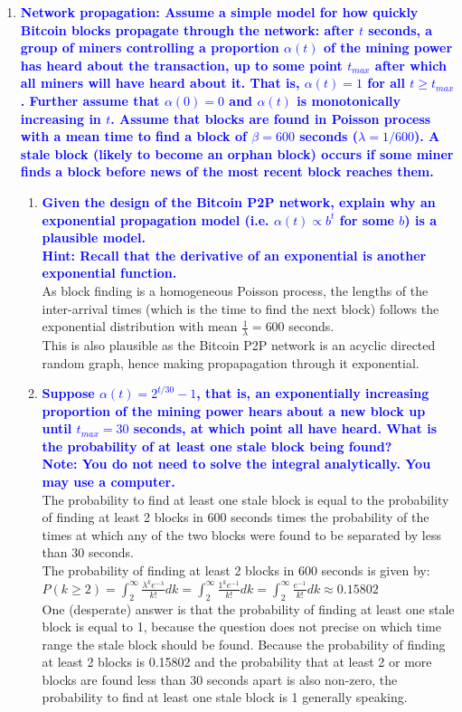 \documentclass[11pt]{article}
\begin{document}
\begin{enumerate}
\item \textbf{\textcolor{blue}{Network propagation: Assume a simple model for how quickly Bitcoin blocks propagate through the network: after $t$ seconds, a group of miners controlling a proportion $\alpha(t)$ of the mining power has heard about the transaction, up to some point $t_{max}$ after which all miners will have heard about it. That is, $\alpha(t) = 1$ for all $t \geq t_{max}$. Further assume that $\alpha(0) = 0$ and $\alpha(t)$ is monotonically increasing in $t$. Assume that blocks are found in Poisson process with a mean time to find a block of $\beta = 600$ seconds ($\lambda = 1/600$). A stale block (likely to become an orphan block) occurs if some miner finds a block before news of the most recent block reaches them.}}
    \begin{enumerate}
    \item \textbf{\textcolor{blue}{Given the design of the Bitcoin P2P network, explain why an exponential propagation model (i.e. $\alpha(t) \propto b^t$ for some $b$) is a plausible model.
    \\ Hint: Recall that the derivative of an exponential is another exponential function.}}
        \\ As block finding is a homogeneous Poisson process, the lengths of the inter-arrival times (which is the time to find the next block) follows the exponential distribution with mean $\frac{1}{\lambda} = 600$ seconds.
        \\ This is also plausible as the Bitcoin P2P network is an acyclic directed random graph, hence making propapagation through it exponential.
    
    \item \textbf{\textcolor{blue}{Suppose $\alpha(t) = 2^{t/30} - 1$, that is, an exponentially increasing proportion of the mining power hears about a new block up until $t_{max} = 30$ seconds, at which point all have heard. What is the probability of at least one stale block being found? 
    \\ Note: You do not need to solve the integral analytically. You may use a computer.}}
        \\ The probability to find at least one stale block is equal to the probability of finding at least 2 blocks in 600 seconds times the probability of the times at which any of the two blocks were found to be separated by less than 30 seconds. 
        \\ The probability of finding at least 2 blocks in 600 seconds is given by:
        \\ $P(k \geq 2) = \int_{2}^{\infty} \frac{\lambda^k e^{-\lambda}}{k!} dk = \int_{2}^{\infty} \frac{1^k e^{-1}}{k!} dk = \int_{2}^{\infty} \frac{e^{-1}}{k!} dk \approx 0.15802$
        \\ One (desperate) answer is that the probability of finding at least one stale block is equal to 1, because the question does not precise on which time range the stale block should be found. Because the probability of finding at least 2 blocks is 0.15802 and the probability that at least 2 or more blocks are found less than 30 seconds apart is also non-zero, the probability to find at least one stale block is 1 generally speaking.


\end{enumerate}
\end{enumerate}
\end{document}
